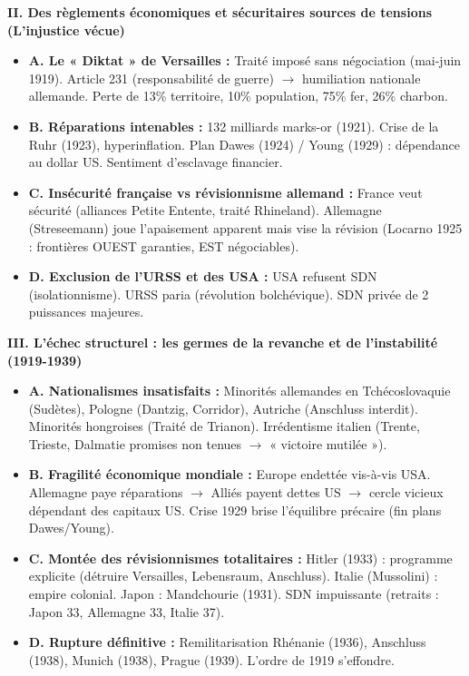 \documentclass[11pt]{article}
\begin{document}
\begin{exoresolu}
\noindent \textbf{II. Des règlements économiques et sécuritaires sources de tensions (L'injustice vécue)}
\begin{itemize}
\item \textbf{A. Le « Diktat » de Versailles :} Traité imposé sans négociation (mai-juin 1919). Article 231 (responsabilité de guerre) $\rightarrow$ humiliation nationale allemande. Perte de 13\% territoire, 10\% population, 75\% fer, 26\% charbon.
\item \textbf{B. Réparations intenables :} 132 milliards marks-or (1921). Crise de la Ruhr (1923), hyperinflation. Plan Dawes (1924) / Young (1929) : dépendance au dollar US. Sentiment d'esclavage financier.
\item \textbf{C. Insécurité française vs révisionnisme allemand :} France veut sécurité (alliances Petite Entente, traité Rhineland). Allemagne (Streseemann) joue l'apaisement apparent mais vise la révision (Locarno 1925 : frontières OUEST garanties, EST négociables).
\item \textbf{D. Exclusion de l'URSS et des USA :} USA refusent SDN (isolationnisme). URSS paria (révolution bolchévique). SDN privée de 2 puissances majeures.
\end{itemize}

\noindent \textbf{III. L'échec structurel : les germes de la revanche et de l'instabilité (1919-1939)}
\begin{itemize}
\item \textbf{A. Nationalismes insatisfaits :} Minorités allemandes en Tchécoslovaquie (Sudètes), Pologne (Dantzig, Corridor), Autriche (Anschluss interdit). Minorités hongroises (Traité de Trianon). Irrédentisme italien (Trente, Trieste, Dalmatie promises non tenues $\rightarrow$ « victoire mutilée »).
\item \textbf{B. Fragilité économique mondiale :} Europe endettée vis-à-vis USA. Allemagne paye réparations $\rightarrow$ Alliés payent dettes US $\rightarrow$ cercle vicieux dépendant des capitaux US. Crise 1929 brise l'équilibre précaire (fin plans Dawes/Young).
\item \textbf{C. Montée des révisionnismes totalitaires :} Hitler (1933) : programme explicite (détruire Versailles, Lebensraum, Anschluss). Italie (Mussolini) : empire colonial. Japon : Mandchourie (1931). SDN impuissante (retraits : Japon 33, Allemagne 33, Italie 37).
\item \textbf{D. Rupture définitive :} Remilitarisation Rhénanie (1936), Anschluss (1938), Munich (1938), Prague (1939). L'ordre de 1919 s'effondre.
\end{itemize}


\end{exoresolu}
\end{document}
